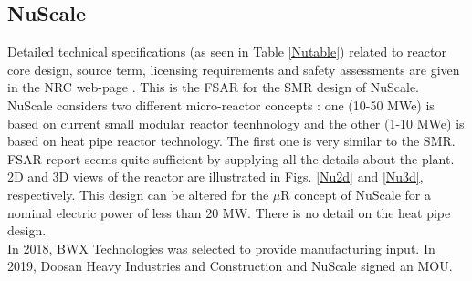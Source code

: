 \documentclass[10pt,a4paper]{article}
\begin{document}
\subsection{NuScale}
Detailed technical specifications (as seen in Table \ref{Nutable}) related to reactor core design, source term, licensing requirements and safety assessments are given in the NRC web-page \cite{nuscale_chapter_2018-1}. This is the \gls{FSAR} for the SMR design of NuScale. NuScale considers two different micro-reactor concepts \cite{nichol_cost_2019}: one (10-50 MWe) is based on current small modular reactor tecnhnology and the other (1-10 MWe) is based on heat pipe reactor technology. The first one is very similar to the SMR. FSAR report  seems quite sufficient by supplying all the details about the plant. 2D and 3D views of the reactor are illustrated in Figs. \ref{Nu2d} and \ref{Nu3d}, respectively. This design can be altered for the $\mu$R concept of NuScale for a nominal electric power of less than 20 MW. There is no detail on the heat pipe design.  \\
In 2018, BWX Technologies was selected to provide manufacturing input. In 2019, Doosan Heavy Industries and Construction and NuScale signed an MOU. 
\end{document}
